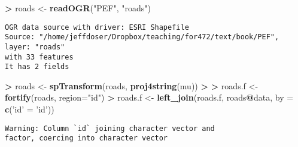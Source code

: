 \documentclass[]{krantz}
\makeatletter
\newenvironment{Shaded}{\begin{snugshade}}{\end{snugshade}}
\newcommand{\KeywordTok}[1]{\textcolor[rgb]{0.27,0.27,0.27}{\textbf{#1}}}
\newcommand{\DataTypeTok}[1]{\textcolor[rgb]{0.27,0.27,0.27}{#1}}
\newcommand{\StringTok}[1]{\textcolor[rgb]{0.5,0.5,0.5}{#1}}
\newcommand{\OperatorTok}[1]{\textcolor[rgb]{0.43,0.43,0.43}{\textbf{#1}}}
\newcommand{\ErrorTok}[1]{\textcolor[rgb]{0.14,0.14,0.14}{\textbf{#1}}}
\newcommand{\NormalTok}[1]{#1}
\newenvironment{kframe}{%
\medskip{}
\setlength{\fboxsep}{.8em}
 \def\at@end@of@kframe{}%
 \ifinner\ifhmode%
  \def\at@end@of@kframe{\end{minipage}}%
  \begin{minipage}{\columnwidth}%
 \fi\fi%
 \def\FrameCommand##1{\hskip\@totalleftmargin \hskip-\fboxsep
 \colorbox{shadecolor}{##1}\hskip-\fboxsep
     \hskip-\linewidth \hskip-\@totalleftmargin \hskip\columnwidth}%
 \MakeFramed {\advance\hsize-\width
   \@totalleftmargin\z@ \linewidth\hsize
   \@setminipage}}%
 {\par\unskip\endMakeFramed%
 \at@end@of@kframe}
\renewenvironment{Shaded}{\begin{kframe}}{\end{kframe}}
\theoremstyle{definition}
\theoremstyle{definition}
\theoremstyle{definition}
\theoremstyle{remark}
\makeatother
\begin{document}
\begin{Shaded}
\begin{Highlighting}[]
\OperatorTok{>}\StringTok{ }\NormalTok{roads <-}\StringTok{ }\KeywordTok{readOGR}\NormalTok{(}\StringTok{"PEF"}\NormalTok{, }\StringTok{"roads"}\NormalTok{)}
\end{Highlighting}
\end{Shaded}

\begin{verbatim}
OGR data source with driver: ESRI Shapefile 
Source: "/home/jeffdoser/Dropbox/teaching/for472/text/book/PEF", layer: "roads"
with 33 features
It has 2 fields
\end{verbatim}

\begin{Shaded}
\begin{Highlighting}[]
\OperatorTok{>}\StringTok{ }\NormalTok{roads <-}\StringTok{ }\KeywordTok{spTransform}\NormalTok{(roads, }\KeywordTok{proj4string}\NormalTok{(mu))}
\OperatorTok{>}\StringTok{ }
\ErrorTok{>}\StringTok{ }\NormalTok{roads.f <-}\StringTok{ }\KeywordTok{fortify}\NormalTok{(roads, }\DataTypeTok{region=}\StringTok{"id"}\NormalTok{)}
\OperatorTok{>}\StringTok{ }\NormalTok{roads.f <-}\StringTok{ }\KeywordTok{left_join}\NormalTok{(roads.f, roads}\OperatorTok{@}\NormalTok{data, }\DataTypeTok{by =} \KeywordTok{c}\NormalTok{(}\StringTok{'id'}\NormalTok{ =}\StringTok{ 'id'}\NormalTok{))}
\end{Highlighting}
\end{Shaded}

\begin{verbatim}
Warning: Column `id` joining character vector and
factor, coercing into character vector
\end{verbatim}
\end{document}
